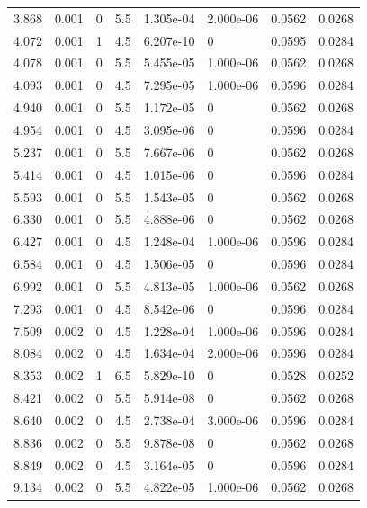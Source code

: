 \documentclass[preview]{standalone}
\begin{document}
{{\begin{tabular}{L{1.2cm}C{1.2cm} C{0.3cm}C{0.5cm} C{1.4cm}C{1.4cm} C{1.4cm}C{1.4cm}}
  3.868  &  0.001  & 0     & 5.5 &  1.305e-04  & 2.000e-06  & 0.0562 &  0.0268   \\ 
  4.072  &  0.001  & 1     & 4.5 &  6.207e-10  & 0  & 0.0595 &  0.0284   \\ 
  4.078  &  0.001  & 0     & 5.5 &  5.455e-05  & 1.000e-06  & 0.0562 &  0.0268   \\ 
  4.093  &  0.001  & 0     & 4.5 &  7.295e-05  & 1.000e-06  & 0.0596 &  0.0284   \\ 
  4.940  &  0.001  & 0     & 5.5 &  1.172e-05  & 0  & 0.0562 &  0.0268   \\ 
  4.954  &  0.001  & 0     & 4.5 &  3.095e-06  & 0  & 0.0596 &  0.0284   \\ 
  5.237  &  0.001  & 0     & 5.5 &  7.667e-06  & 0  & 0.0562 &  0.0268   \\ 
  5.414  &  0.001  & 0     & 4.5 &  1.015e-06  & 0  & 0.0596 &  0.0284   \\ 
  5.593  &  0.001  & 0     & 5.5 &  1.543e-05  & 0  & 0.0562 &  0.0268   \\ 
  6.330  &  0.001  & 0     & 5.5 &  4.888e-06  & 0  & 0.0562 &  0.0268   \\ 
  6.427  &  0.001  & 0     & 4.5 &  1.248e-04  & 1.000e-06  & 0.0596 &  0.0284   \\ 
  6.584  &  0.001  & 0     & 4.5 &  1.506e-05  & 0  & 0.0596 &  0.0284   \\ 
  6.992  &  0.001  & 0     & 5.5 &  4.813e-05  & 1.000e-06  & 0.0562 &  0.0268   \\ 
  7.293  &  0.001  & 0     & 4.5 &  8.542e-06  & 0  & 0.0596 &  0.0284   \\ 
  7.509  &  0.002  & 0     & 4.5 &  1.228e-04  & 1.000e-06  & 0.0596 &  0.0284   \\ 
  8.084  &  0.002  & 0     & 4.5 &  1.634e-04  & 2.000e-06  & 0.0596 &  0.0284   \\ 
  8.353  &  0.002  & 1     & 6.5 &  5.829e-10  & 0  & 0.0528 &  0.0252   \\ 
  8.421  &  0.002  & 0     & 5.5 &  5.914e-08  & 0  & 0.0562 &  0.0268   \\ 
  8.640  &  0.002  & 0     & 4.5 &  2.738e-04  & 3.000e-06  & 0.0596 &  0.0284   \\ 
  8.836  &  0.002  & 0     & 5.5 &  9.878e-08  & 0  & 0.0562 &  0.0268   \\ 
  8.849  &  0.002  & 0     & 4.5 &  3.164e-05  & 0  & 0.0596 &  0.0284   \\ 
  9.134  &  0.002  & 0     & 5.5 &  4.822e-05  & 1.000e-06  & 0.0562 &  0.0268   \\ 

\end{tabular}}}
\end{document}
